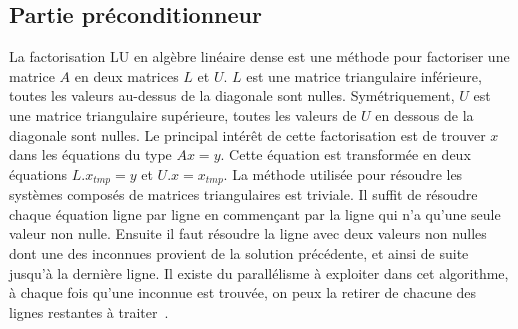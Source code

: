 \subsection{Partie préconditionneur}
La factorisation LU en algèbre linéaire dense est une méthode pour factoriser une matrice $A$ en deux matrices $L$ et $U$.
%
$L$ est une matrice triangulaire inférieure, toutes les valeurs au-dessus de la diagonale sont nulles.
%
Symétriquement, $U$ est une matrice triangulaire supérieure, toutes les valeurs de $U$ en dessous de la diagonale sont nulles.
%
Le principal intérêt de cette factorisation est de trouver $x$ dans les équations du type $Ax=y$.
%
Cette équation est transformée en deux équations $L.x_{tmp}=y$ et $U.x=x_{tmp}$.
%
La méthode utilisée pour résoudre les systèmes composés de matrices triangulaires est triviale.
%
Il suffit de résoudre chaque équation ligne par ligne en commençant par la ligne qui n'a qu'une seule valeur non nulle.
%
Ensuite il faut résoudre la ligne avec deux valeurs non nulles dont une des inconnues provient de la solution précédente, et ainsi de suite jusqu'à la dernière ligne.
%
Il existe du parallélisme à exploiter dans cet algorithme, à chaque fois qu'une inconnue est trouvée, on peux la retirer de chacune des lignes restantes à traiter~\cite{plasma_lu}.



